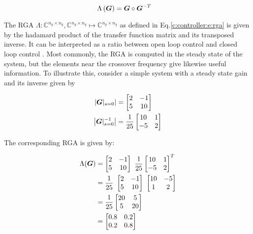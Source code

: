 \begin{align}
\begin{split}
\Lambda\left(\mbox{\boldmath$G$}\right) &= \mbox{\boldmath$G$} \circ \mbox{\boldmath$G$}^{-T}
\end{split}
\label{c:controller:e:rga}
\end{align}

The RGA $\Lambda:\mathbb{C}^{n_y \times n_y},\mathbb{C}^{n_y \times n_y} \mapsto \mathbb{C}^{n_y \times n_y}$ as defined in Eq.\ref{c:controller:e:rga} is given by the hadamard product of the transfer function matrix and its transposed inverse. It can be interpreted as a ratio between open loop control and closed loop control \cite[p.221]{Glad2000}. Most commonly, the RGA is computed in the steady state of the system, but the elements near the crossover frequency give likewise useful information. To illustrate this, consider a simple system with a steady state gain and its inverse given by

\begin{align}
\begin{split}
\left|\mbox{\boldmath$G$}|_{s=0}\right| &= \begin{bmatrix}
2 & -1 \\
5 & 10
\end{bmatrix} \\
\left| \mbox{\boldmath$G$}|_{s=0}^{-1} \right| &= \frac{1}{25} \begin{bmatrix}
10 & 1 \\
-5 & 2
\end{bmatrix}
\end{split}
\end{align}

The corresponding RGA is given by:

\begin{align}
\begin{split}
\Lambda(\mbox{\boldmath$G$}) &= \begin{bmatrix}
2 & -1 \\
5 & 10
\end{bmatrix} ~\frac{1}{25} \begin{bmatrix}
10 & 1 \\
-5 & 2
\end{bmatrix}^T \\
&= \frac{1}{25}~\begin{bmatrix}
2 & -1 \\
5 & 10
\end{bmatrix} ~ \begin{bmatrix}
10 & -5 \\
1 & 2
\end{bmatrix} \\
&= \frac{1}{25} \begin{bmatrix}
20 & 5 \\
5 & 20
\end{bmatrix}\\
&= \begin{bmatrix}
0.8 & 0.2 \\
0.2 & 0.8
\end{bmatrix}
\end{split}
\end{align}

